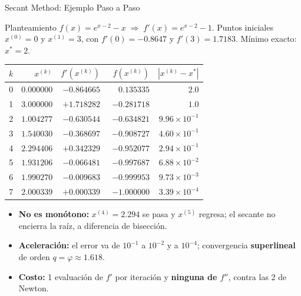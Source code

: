 \begin{frame}{Secant Method: Ejemplo Paso a Paso}
    \begin{exampleblock}{Planteamiento}
        \scriptsize
        $f(x)=e^{x-2}-x \;\Rightarrow\; f'(x)=e^{x-2}-1$.
        Puntos iniciales $x^{(0)}=0$ y $x^{(1)}=3$, con
        $f'(0)=-0.8647$ y $f'(3)=1.7183$. Mínimo exacto: $x^{*}=2$.
    \end{exampleblock}

    \vspace{-0.2em}
    \begin{center}
    \scriptsize
    \begin{tabular}{c r r r r}
        \toprule
        $k$ & $x^{(k)}$ & $f'(x^{(k)})$ & $f(x^{(k)})$ & $|x^{(k)}-x^{*}|$ \\
        \midrule
        0 & $0.000000$ & $-0.864665$ & $\phantom{-}0.135335$ & $2.0$ \\
        1 & $3.000000$ & $+1.718282$ & $-0.281718$ & $1.0$ \\
        2 & $1.004277$ & $-0.630544$ & $-0.634821$ & $9.96\times10^{-1}$ \\
        3 & $1.540030$ & $-0.368697$ & $-0.908727$ & $4.60\times10^{-1}$ \\
        4 & $2.294406$ & $+0.342329$ & $-0.952077$ & $2.94\times10^{-1}$ \\
        5 & $1.931206$ & $-0.066481$ & $-0.997687$ & $6.88\times10^{-2}$ \\
        6 & $1.990270$ & $-0.009683$ & $-0.999953$ & $9.73\times10^{-3}$ \\
        7 & $2.000339$ & $+0.000339$ & $-1.000000$ & $3.39\times10^{-4}$ \\
        \bottomrule
    \end{tabular}
    \end{center}

    \vspace{0.1em}
    \begin{itemize}\scriptsize
        \item \textbf{No es monótono:} $x^{(4)}=2.294$ se pasa y $x^{(5)}$ regresa;
              el secante no encierra la raíz, a diferencia de bisección.
        \item \textbf{Aceleración:} el error va de $10^{-1}$ a $10^{-2}$ y a $10^{-4}$;
              convergencia \textbf{superlineal} de orden $q=\varphi\approx 1.618$.
        \item \textbf{Costo:} 1 evaluación de $f'$ por iteración y \textbf{ninguna de
              $f''$}, contra las 2 de Newton.
    \end{itemize}
\end{frame}

